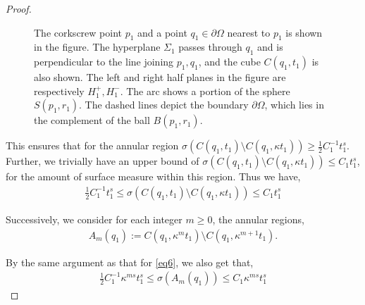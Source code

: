 \documentclass[10pt,a4paper]{amsart}
\begin{document}
\begin{proof}
\begin{figure}

\caption{The corkscrew point $p_1$ and a point $q_1\in\partial\Omega$ nearest to $p_1$ is shown in the figure. The hyperplane $\Sigma_1$ passes through $q_1$ and is perpendicular to the line joining $p_1,q_1$, and the cube $C(q_1,t_1)$ is also shown. The left and right half planes in the figure are respectively $H^{+}_1, H^{-}_1$. The arc shows a portion of the sphere $S(p_1, r_1)$. The dashed lines depict the boundary $\partial\Omega$, which lies in the complement of the ball $B(p_1,r_1)$.}
\end{figure}

This ensures that for the annular region $\sigma(C(q_1,t_1)\setminus C(q_1,\kappa t_1))\geq \frac{1}{2}  C_{1}^{-1} t_{1}^{s} $. Further, we trivially have an upper bound of $\sigma(C(q_1,t_1)\setminus C(q_1,\kappa t_1))\leq C_1 t_{1}^s$, for the amount of surface measure within this region. Thus we have, 
\begin{align}\label{eq6}
    \frac{1}{2}  C_{1}^{-1} t_{1}^{s}\leq \sigma(C(q_1,t_1)\setminus C(q_1,\kappa t_1))\leq C_1 t_{1}^s
\end{align}

Successively, we consider for each integer $m\geq 0$, the annular regions, 
\begin{align}
    A_m (q_1):= C(q_1,\kappa ^m t_1)\setminus C(q_1,\kappa^{m+1} t_1).
\end{align}

By the same argument as that for \cref{eq6}, we also get that,
\begin{align}
    \frac{1}{2}  C_{1}^{-1} \kappa^{ms}t_{1}^{s}\leq \sigma(A_m (q_1))\leq C_1 \kappa^{ms} t_{1}^s
\end{align}\end{proof}
\end{document}
